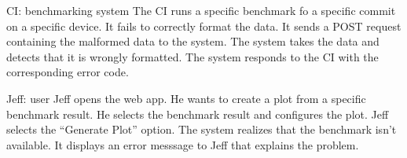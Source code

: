 {CI: \Gls{benchmarking system}}
{The CI runs a specific benchmark fo a specific commit on a specific device. It fails to correctly format the data. It sends a POST request containing the malformed data to the system. The system takes the data and detects that it is wrongly formatted. The system responds to the CI with the corresponding error code.}

{Jeff: \Gls{user}}
{Jeff opens the web app. He wants to create a \gls{plot} from a specific benchmark result. He selects the benchmark result and configures the \gls{plot}. Jeff selects the \enquote{Generate Plot} option. The system realizes that the benchmark isn't available. It displays an error messsage to Jeff that explains the problem.}

